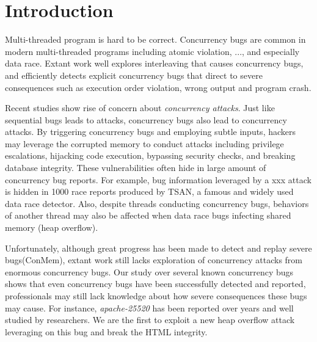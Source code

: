 \section{Introduction} \label{sec:intro}


Multi-threaded program is hard to be correct. 
Concurrency bugs are common in modern multi-threaded programs\cite{lu:concurrency-bugs,conmem:asplos10,conseq:asplos11, lu:muvi:sosp} 
including atomic violation, ..., and especially data race.
Extant work well explores interleaving that causes concurrency bugs, 
and efficiently detects explicit concurrency bugs that direct to  
severe consequences such as execution order violation, wrong output and program crash.

Recent studies\cite{acidrain:sigmod17,con:hotpar12} show rise of concern about \emph{concurrency attacks}.
Just like sequential bugs leads to attacks, concurrency bugs also lead to concurrency attacks. 
By triggering concurrency bugs and employing subtle inputs, 
hackers may leverage the corrupted memory to conduct  
attacks including privilege escalations\cite{}, hijacking code execution\cite{}, bypassing security checks\cite{}, 
and breaking database integrity\cite{acidrain:sigmod17}.
These vulnerabilities often hide in large amount of concurrency bug reports. 
For example, bug information leveraged by a xxx attack is hidden in 1000 race reports 
produced by TSAN\cite{tsan}, a famous and widely used data race detector. 
Also, despite threads conducting concurrency bugs, 
behaviors of another thread may also be affected when data race bugs infecting shared memory (\eg heap overflow)\cite{apache-bug-25520,}. 


Unfortunately, although great progress has been made to detect and replay severe bugs(\eg ConMem\cite{conmem:asplos10}), 
extant work still lacks exploration of concurrency attacks from enormous concurrency bugs. Our study over several known concurrency 
bugs\cite{apache-bug-25520, apache-bug-46215} shows that even concurrency bugs have been successfully detected and reported, 
professionals may still lack knowledge about how severe consequences these bugs may cause. 
For instance, \emph{apache-25520}\cite{apache-bug-25520} has been 
reported over years and well studied by researchers\cite{lu:concurrency-bugs}.  
We are the first to exploit a new heap overflow attack leveraging on this bug and break the HTML integrity.  

